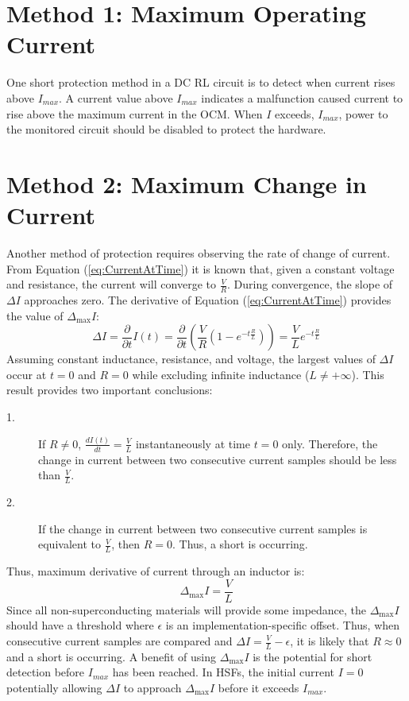 \documentclass[11pt,compsoc,oneside]{report}
\begin{document}
\section{Method 1: Maximum Operating Current}
One short protection method in a DC RL circuit is to detect when current rises above $I_{max}$. A current value above $I_{max}$ indicates a malfunction caused current to rise above the maximum current in the OCM. When $I$ exceeds, $I_{max}$, power to the monitored circuit should be disabled to protect the hardware. 
\section{Method 2: Maximum Change in Current}
Another method of protection requires observing the rate of change of current. From Equation (\ref{eq:CurrentAtTime}) it is known that, given a constant voltage and resistance, the current will converge to $\frac{V}{R}$. During convergence, the slope of $\Delta I$ approaches zero. The derivative of Equation (\ref{eq:CurrentAtTime}) provides the value of $\Delta_{\max}I$:
\begin{equation}
\Delta I = \frac{\partial}{\partial t}I(t) = \frac{\partial}{\partial t}(\frac{V}{R}(1-e^{-t \frac{R}{L}})) = \frac{V}{L}e^{-t \frac{R}{L}}
\end{equation}
Assuming constant inductance, resistance, and voltage, the largest values of $\Delta I$ occur at $t = 0$ and $R = 0$ while excluding infinite inductance ($L \neq +\infty$). This result provides two important conclusions:
\begin{description}
\item [1.] If $R \neq 0$, $\frac{dI(t)}{dt} = \frac{V}{L}$ instantaneously at time $t = 0$ only. Therefore, the change in current between two consecutive current samples should be less than $\frac{V}{L}$.
\item [2.] If the change in current between two consecutive current samples is equivalent to $\frac{V}{L}$, then $R = 0$. Thus, a short is occurring.
\end{description}
Thus, maximum derivative of current through an inductor is:
\begin{equation}\label{eq:DeltaMax}
\Delta_{\max}I = \frac{V}{L} \nonumber
\end{equation}
Since all non-superconducting materials will provide some impedance, the $\Delta_{\max}I$ should have a threshold where $\epsilon$ is an implementation-specific offset. Thus, when consecutive current samples are compared and $\Delta I = \frac{V}{L} - \epsilon $, it is likely that $R \approx 0$ and a short is occurring. A benefit of using $\Delta_{\max}I$ is the potential for short detection before $I_{max}$ has been reached. In HSFs, the initial current $I = 0$ potentially allowing $\Delta I$ to approach $\Delta_{\max}I$ before it exceeds $I_{max}$.
\end{document}

